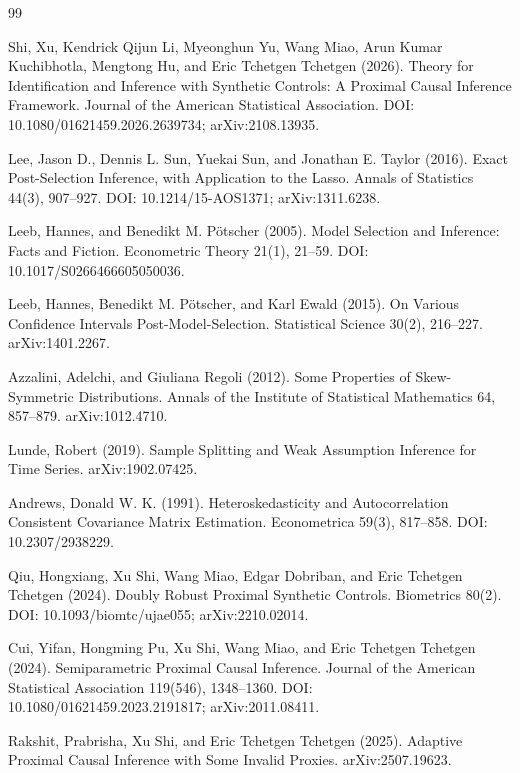 \documentclass{article}
\begin{document}
\begin{thebibliography}{99}

   Shi, Xu, Kendrick Qijun Li, Myeonghun Yu, Wang Miao, Arun Kumar Kuchibhotla, Mengtong Hu, and Eric Tchetgen Tchetgen (2026). Theory for Identification and Inference with Synthetic Controls: A Proximal Causal Inference Framework. Journal of the American Statistical Association. DOI: 10.1080/01621459.2026.2639734; arXiv:2108.13935.

   Lee, Jason D., Dennis L. Sun, Yuekai Sun, and Jonathan E. Taylor (2016). Exact Post-Selection Inference, with Application to the Lasso. Annals of Statistics 44(3), 907--927. DOI: 10.1214/15-AOS1371; arXiv:1311.6238.

   Leeb, Hannes, and Benedikt M. Pötscher (2005). Model Selection and Inference: Facts and Fiction. Econometric Theory 21(1), 21--59. DOI: 10.1017/S0266466605050036.

   Leeb, Hannes, Benedikt M. Pötscher, and Karl Ewald (2015). On Various Confidence Intervals Post-Model-Selection. Statistical Science 30(2), 216--227. arXiv:1401.2267.

   Azzalini, Adelchi, and Giuliana Regoli (2012). Some Properties of Skew-Symmetric Distributions. Annals of the Institute of Statistical Mathematics 64, 857--879. arXiv:1012.4710.

   Lunde, Robert (2019). Sample Splitting and Weak Assumption Inference for Time Series. arXiv:1902.07425.

   Andrews, Donald W. K. (1991). Heteroskedasticity and Autocorrelation Consistent Covariance Matrix Estimation. Econometrica 59(3), 817--858. DOI: 10.2307/2938229.

   Qiu, Hongxiang, Xu Shi, Wang Miao, Edgar Dobriban, and Eric Tchetgen Tchetgen (2024). Doubly Robust Proximal Synthetic Controls. Biometrics 80(2). DOI: 10.1093/biomtc/ujae055; arXiv:2210.02014.

   Cui, Yifan, Hongming Pu, Xu Shi, Wang Miao, and Eric Tchetgen Tchetgen (2024). Semiparametric Proximal Causal Inference. Journal of the American Statistical Association 119(546), 1348--1360. DOI: 10.1080/01621459.2023.2191817; arXiv:2011.08411.

   Rakshit, Prabrisha, Xu Shi, and Eric Tchetgen Tchetgen (2025). Adaptive Proximal Causal Inference with Some Invalid Proxies. arXiv:2507.19623.


\end{thebibliography}
\end{document}
